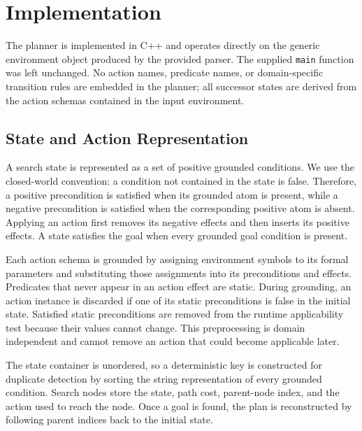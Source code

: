 
\section{Implementation}
\label{sec:implementation}

The planner is implemented in C++ and operates directly on the generic
environment object produced by the provided parser.  The supplied
\texttt{main} function was left unchanged.  No action names, predicate names,
or domain-specific transition rules are embedded in the planner; all successor
states are derived from the action schemas contained in the input environment.

\subsection{State and Action Representation}

A search state is represented as a set of positive grounded conditions.  We
use the closed-world convention: a condition not contained in the state is
false.  Therefore, a positive precondition is satisfied when its grounded atom
is present, while a negative precondition is satisfied when the corresponding
positive atom is absent.  Applying an action first removes its negative effects
and then inserts its positive effects.  A state satisfies the goal when every
grounded goal condition is present.

Each action schema is grounded by assigning environment symbols to its formal
parameters and substituting those assignments into its preconditions and
effects.  Predicates that never appear in an action effect are static.  During
grounding, an action instance is discarded if one of its static preconditions
is false in the initial state.  Satisfied static preconditions are removed from
the runtime applicability test because their values cannot change.  This
preprocessing is domain independent and cannot remove an action that could
become applicable later.

The state container is unordered, so a deterministic key is constructed for
duplicate detection by sorting the string representation of every grounded
condition.  Search nodes store the state, path cost, parent-node index, and the
action used to reach the node.  Once a goal is found, the plan is reconstructed
by following parent indices back to the initial state.

